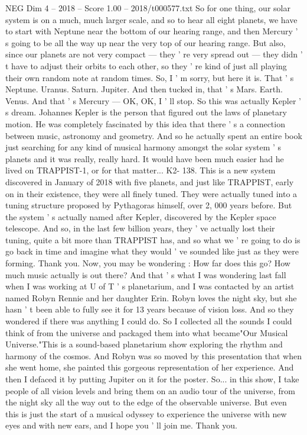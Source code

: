\begin{textsample}{NEG Dim 4 – 2018 – Score 1.00 – 2018/t000577.txt}
So for one thing, our solar system is on a much, much larger scale, and so to hear all eight planets, we have to start with Neptune near the bottom of our hearing range, and then Mercury ' s going to be all the way up near the very top of our hearing range.
But also, since our planets are not very compact — they ' re very spread out — they didn ' t have to adjust their orbits to each other, so they ' re kind of just all playing their own random note at random times.
So, I ' m sorry, but here it is.
That ' s Neptune.
Uranus.
Saturn.
Jupiter.
And then tucked in, that ' s Mars.
Earth.
Venus.
And that ' s Mercury — OK, OK, I ' ll stop.
So this was actually Kepler ' s dream.
Johannes Kepler is the person that figured out the laws of planetary motion.
He was completely fascinated by this idea that there ' s a connection between music, astronomy and geometry.
And so he actually spent an entire book just searching for any kind of musical harmony amongst the solar system ' s planets and it was really, really hard.
It would have been much easier had he lived on TRAPPIST-1, or for that matter...
K2- 138.
This is a new system discovered in January of 2018 with five planets, and just like TRAPPIST, early on in their existence, they were all finely tuned.
They were actually tuned into a tuning structure proposed by Pythagoras himself, over 2, 000 years before.
But the system ' s actually named after Kepler, discovered by the Kepler space telescope.
And so, in the last few billion years, they ' ve actually lost their tuning, quite a bit more than TRAPPIST has, and so what we ' re going to do is go back in time and imagine what they would ' ve sounded like just as they were forming.
Thank you.
Now, you may be wondering : How far does this go?
How much music actually is out there?
And that ' s what I was wondering last fall when I was working at U of T ' s planetarium, and I was contacted by an artist named Robyn Rennie and her daughter Erin.
Robyn loves the night sky, but she hasn ' t been able to fully see it for 13 years because of vision loss.
And so they wondered if there was anything I could do.
So I collected all the sounds I could think of from the universe and packaged them into what became"Our Musical Universe."This is a sound-based planetarium show exploring the rhythm and harmony of the cosmos.
And Robyn was so moved by this presentation that when she went home, she painted this gorgeous representation of her experience.
And then I defaced it by putting Jupiter on it for the poster.
So... in this show, I take people of all vision levels and bring them on an audio tour of the universe, from the night sky all the way out to the edge of the observable universe.
But even this is just the start of a musical odyssey to experience the universe with new eyes and with new ears, and I hope you ' ll join me.
Thank you.

\end{textsample}
